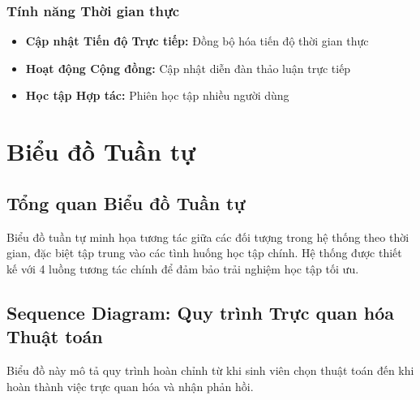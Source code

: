 \subsubsection{Tính năng Thời gian thực}
\begin{itemize}
    \item \textbf{Cập nhật Tiến độ Trực tiếp:} Đồng bộ hóa tiến độ thời gian thực
    \item \textbf{Hoạt động Cộng đồng:} Cập nhật diễn đàn thảo luận trực tiếp
    \item \textbf{Học tập Hợp tác:} Phiên học tập nhiều người dùng
\end{itemize}

\section{Biểu đồ Tuần tự}
\label{sec:sequence-diagram}

\subsection{Tổng quan Biểu đồ Tuần tự}
\label{subsec:sequence-overview}

Biểu đồ tuần tự minh họa tương tác giữa các đối tượng trong hệ thống theo thời gian, đặc biệt tập trung vào các tình huống học tập chính. Hệ thống được thiết kế với 4 luồng tương tác chính để đảm bảo trải nghiệm học tập tối ưu.

\subsection{Sequence Diagram: Quy trình Trực quan hóa Thuật toán}
\label{subsec:algorithm-visualization-sequence}

Biểu đồ này mô tả quy trình hoàn chỉnh từ khi sinh viên chọn thuật toán đến khi hoàn thành việc trực quan hóa và nhận phản hồi.

